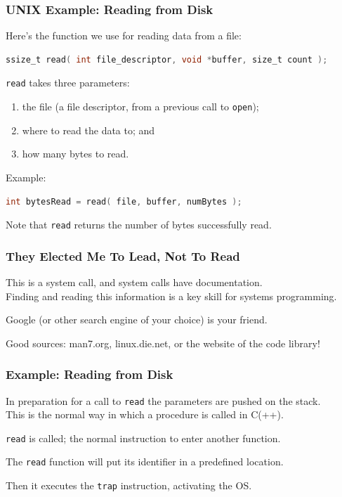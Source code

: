 \begin{frame}[fragile]
	\frametitle{UNIX Example: Reading from Disk}
	
Here's the function we use for reading data from a file:
	
		\begin{lstlisting}[language=C]
ssize_t read( int file_descriptor, void *buffer, size_t count );
		\end{lstlisting}


	\texttt{read} takes three parameters:
	\begin{enumerate}
		\item the file (a file descriptor, from a previous call
		      to \texttt{open});
		\item where to read the data to; and
		\item how many bytes to read.
	\end{enumerate}
	
	Example:

		\begin{lstlisting}[language=C]
int bytesRead = read( file, buffer, numBytes );
		\end{lstlisting}


	Note that \texttt{read} returns the number of bytes successfully read.

\end{frame}


\begin{frame}
\frametitle{They Elected Me To Lead, Not To Read}

This is a system call, and system calls have documentation.\\
\quad Finding and reading this information is a key skill for systems programming.

Google (or other search engine of your choice) is your friend.

Good sources: man7.org, linux.die.net, or the website of the code library!

\end{frame}


\begin{frame}
	\frametitle{Example: Reading from Disk}

	In preparation for a call to \texttt{read} the parameters are pushed on the stack.\\
	\quad This is the normal way in which a procedure is called in C(++).

	\texttt{read} is called; the normal instruction to enter another function.

	The \texttt{read} function will put its identifier in a predefined location.

	Then it executes the \texttt{trap} instruction, activating the OS.

\end{frame}

